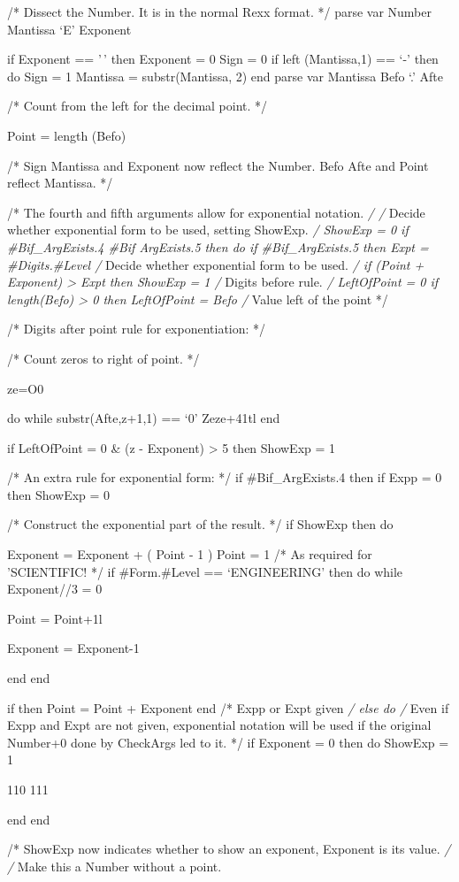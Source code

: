 /* Dissect the Number. It is in the normal Rexx format. */ parse var
Number Mantissa `E' Exponent

if Exponent == '\,' then Exponent = 0 Sign = 0 if left (Mantissa,1) ==
`-' then do Sign = 1 Mantissa = substr(Mantissa, 2) end parse var
Mantissa Befo `.' Afte

/* Count from the left for the decimal point. */

Point = length (Befo)

/* Sign Mantissa and Exponent now reflect the Number. Befo Afte and
Point reflect Mantissa. */

/* The fourth and fifth arguments allow for exponential notation.
\emph{/ /} Decide whether exponential form to be used, setting ShowExp.
\emph{/ ShowExp = 0 if \#Bif\_ArgExists.4 \#Bif ArgExists.5 then do if
\#Bif\_ArgExists.5 then Expt = \#Digits.\#Level /} Decide whether
exponential form to be used. \emph{/ if (Point + Exponent)
\textgreater{} Expt then ShowExp = 1 /} Digits before rule. \emph{/
LeftOfPoint = 0 if length(Befo) \textgreater{} 0 then LeftOfPoint = Befo
/} Value left of the point */

/* Digits after point rule for exponentiation: */

/* Count zeros to right of point. */

ze=O0

do while substr(Afte,z+1,1) == `0' Zeze+41tl end

if LeftOfPoint = 0 \& (z - Exponent) \textgreater{} 5 then ShowExp = 1

/* An extra rule for exponential form: */ if \#Bif\_ArgExists.4 then if
Expp = 0 then ShowExp = 0

/* Construct the exponential part of the result. */ if ShowExp then do

Exponent = Exponent + ( Point - 1 ) Point = 1 /* As required for
'SCIENTIFIC! */ if \#Form.\#Level == `ENGINEERING' then do while
Exponent//3 = 0

Point = Point+1l

Exponent = Exponent-1

end end

if \ShowExp then Point = Point + Exponent end /* Expp or Expt given
\emph{/ else do /} Even if Expp and Expt are not given, exponential
notation will be used if the original Number+0 done by CheckArgs led to
it. */ if Exponent = 0 then do ShowExp = 1

110 111

end end

/* ShowExp now indicates whether to show an exponent, Exponent is its
value. \emph{/ /} Make this a Number without a point.

